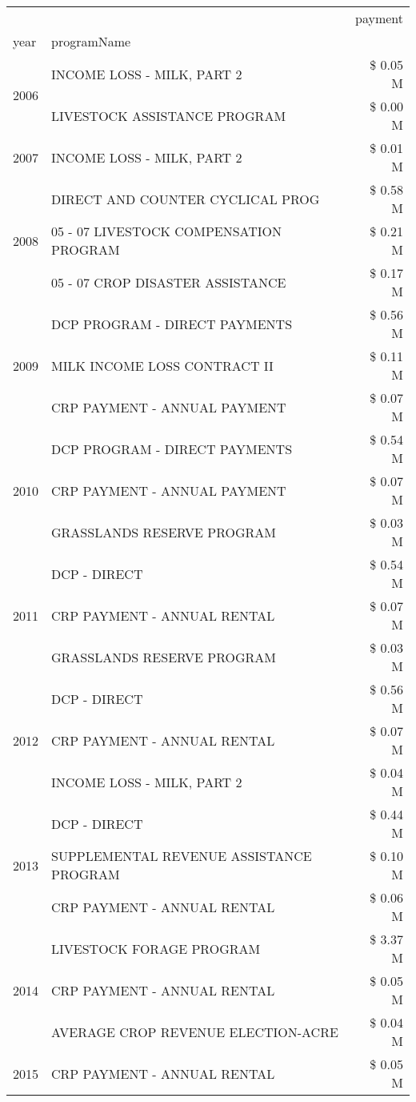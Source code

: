 \begin{tabular}{llr}
\toprule
 &  & payment \\
year & programName &  \\
\midrule
\multirow[t]{2}{*}{2006} & INCOME LOSS - MILK, PART 2 & \$ 0.05 M \\
 & LIVESTOCK ASSISTANCE PROGRAM & \$ 0.00 M \\
\cline{1-3}
2007 & INCOME LOSS - MILK, PART 2 & \$ 0.01 M \\
\cline{1-3}
\multirow[t]{3}{*}{2008} & DIRECT AND COUNTER CYCLICAL PROG & \$ 0.58 M \\
 & 05 - 07 LIVESTOCK COMPENSATION PROGRAM & \$ 0.21 M \\
 & 05 - 07 CROP DISASTER ASSISTANCE & \$ 0.17 M \\
\cline{1-3}
\multirow[t]{3}{*}{2009} & DCP PROGRAM - DIRECT PAYMENTS & \$ 0.56 M \\
 & MILK INCOME LOSS CONTRACT II & \$ 0.11 M \\
 & CRP PAYMENT - ANNUAL PAYMENT & \$ 0.07 M \\
\cline{1-3}
\multirow[t]{3}{*}{2010} & DCP PROGRAM - DIRECT PAYMENTS & \$ 0.54 M \\
 & CRP PAYMENT - ANNUAL PAYMENT & \$ 0.07 M \\
 & GRASSLANDS RESERVE PROGRAM & \$ 0.03 M \\
\cline{1-3}
\multirow[t]{3}{*}{2011} & DCP - DIRECT & \$ 0.54 M \\
 & CRP PAYMENT - ANNUAL RENTAL & \$ 0.07 M \\
 & GRASSLANDS RESERVE PROGRAM & \$ 0.03 M \\
\cline{1-3}
\multirow[t]{3}{*}{2012} & DCP - DIRECT & \$ 0.56 M \\
 & CRP PAYMENT - ANNUAL RENTAL & \$ 0.07 M \\
 & INCOME LOSS - MILK, PART 2 & \$ 0.04 M \\
\cline{1-3}
\multirow[t]{3}{*}{2013} & DCP - DIRECT & \$ 0.44 M \\
 & SUPPLEMENTAL REVENUE ASSISTANCE PROGRAM & \$ 0.10 M \\
 & CRP PAYMENT - ANNUAL RENTAL & \$ 0.06 M \\
\cline{1-3}
\multirow[t]{3}{*}{2014} & LIVESTOCK FORAGE PROGRAM & \$ 3.37 M \\
 & CRP PAYMENT - ANNUAL RENTAL & \$ 0.05 M \\
 & AVERAGE CROP REVENUE ELECTION-ACRE & \$ 0.04 M \\
\cline{1-3}
\multirow[t]{3}{*}{2015} & CRP PAYMENT - ANNUAL RENTAL & \$ 0.05 M \\

\end{tabular}
